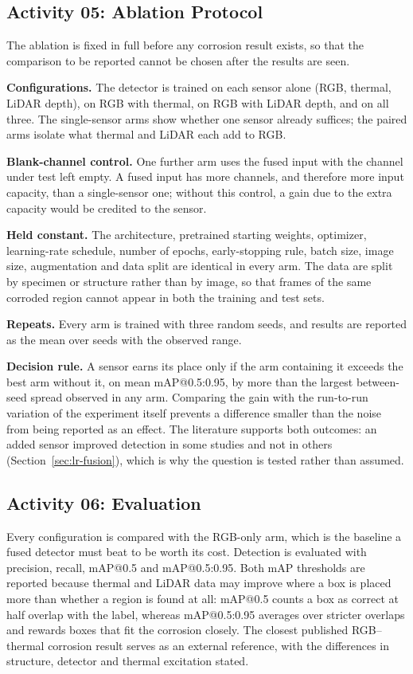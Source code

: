 \subsection{Activity 05: Ablation Protocol}
\label{sec:ablation}

The ablation is fixed in full before any corrosion result exists, so that the
comparison to be reported cannot be chosen after the results are seen.

\textbf{Configurations.} The detector is trained on each sensor alone (RGB,
thermal, LiDAR depth), on RGB with thermal, on RGB with LiDAR depth, and on all
three. The single-sensor arms show whether one sensor already suffices; the
paired arms isolate what thermal and LiDAR each add to RGB.

\textbf{Blank-channel control.} One further arm uses the fused input with the
channel under test left empty. A fused input has more channels, and therefore
more input capacity, than a single-sensor one; without this control, a gain due
to the extra capacity would be credited to the sensor.

\textbf{Held constant.} The architecture, pretrained starting weights, optimizer,
learning-rate schedule, number of epochs, early-stopping rule, batch size, image
size, augmentation and data split are identical in every arm. The data are split
by specimen or structure rather than by image, so that frames of the same
corroded region cannot appear in both the training and test sets.

\textbf{Repeats.} Every arm is trained with three random seeds, and results are
reported as the mean over seeds with the observed range.

\textbf{Decision rule.} A sensor earns its place only if the arm containing it
exceeds the best arm without it, on mean mAP@0.5:0.95, by more than the largest
between-seed spread observed in any arm. Comparing the gain with the run-to-run
variation of the experiment itself prevents a difference smaller than the noise
from being reported as an effect. The literature supports both outcomes: an
added sensor improved detection in some studies and not in others
(Section~\ref{sec:lr-fusion}), which is why the question is tested rather than
assumed.

\subsection{Activity 06: Evaluation}
\label{sec:evaluation}

Every configuration is compared with the RGB-only arm, which is the baseline a
fused detector must beat to be worth its cost. Detection is evaluated with
precision, recall, mAP@0.5 and mAP@0.5:0.95. Both mAP thresholds are reported
because thermal and LiDAR data may improve where a box is placed more than
whether a region is found at all: mAP@0.5 counts a box as correct at half
overlap with the label, whereas mAP@0.5:0.95 averages over stricter overlaps and
rewards boxes that fit the corrosion closely. The closest published RGB--thermal
corrosion result \citep{Lim2021} serves as an external reference, with the
differences in structure, detector and thermal excitation stated.

